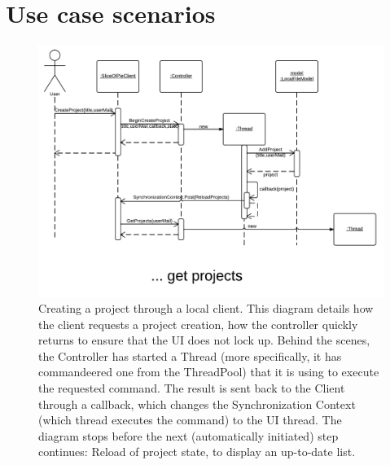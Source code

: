 \section{Use case scenarios}
\label{sec:usecasescenarios}

\begin{figure}[htb]
	\centering
	\includegraphics[width=1\textwidth]{Appendices/graphics/usecasescenario-createproject-local.png}
	\caption{Creating a project through a local client. This diagram details how the client requests a project
        creation, how the controller quickly returns to ensure that the UI does not lock up. Behind the scenes,
        the Controller has started a Thread (more specifically, it has commandeered one from the ThreadPool) that
        it is using to execute the requested command. The result is sent back to the Client through a callback,
        which changes the Synchronization Context (which thread executes the command) to the UI thread. The diagram
        stops before the next (automatically initiated) step continues: Reload of project state, to display an
        up-to-date list.}
	\label{fig:usecasescenario-01}
\end{figure}